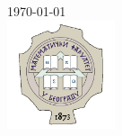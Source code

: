 \begin{titlepage}

{\large \today}\\[2cm] %


\includegraphics[width=120px]{logo.png}\\[1cm] %
 

\vfill %

\end{titlepage}